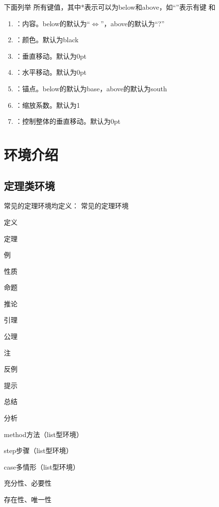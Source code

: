\documentclass{xdyy-usermanual}
\begin{document}
下面列举  所有键值，其中*表示可以为below和above，如“”表示有键  和 
\begin{enumerate}
  \item {}：内容。below的默认为“$\Longleftrightarrow$”，above的默认为“?”
  \item {}：颜色。默认为black
  \item {}：垂直移动。默认为0pt
  \item {}：水平移动。默认为0pt
  \item {}：锚点。below的默认为base，above的默认为south
  \item {}：缩放系数。默认为1
  \item {}：控制整体的垂直移动。默认为0pt
\end{enumerate}



\section{环境介绍}


\subsection{定理类环境}

常见的定理环境均定义：
常见的定理环境
  \begin{xchoices}[label-style = arabic]
    \item 定义
    \item 定理
    \item 例
    \item 性质
    \item 命题
    \item 推论
    \item 引理
    \item 公理
    \item 注
    \item 反例
    \item 提示
    \item 总结
    \item 分析
    \item method方法（list型环境）
    \item step步骤（list型环境）
    \item case多情形（list型环境）
    \item 充分性、必要性
    \item 存在性、唯一性
  \end{xchoices}
\end{document}
